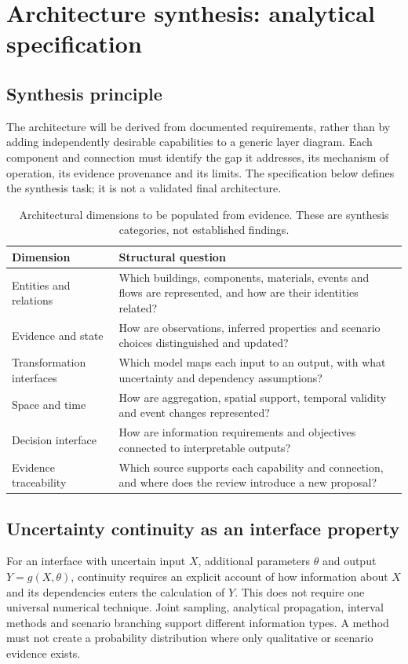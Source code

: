 \section{Architecture synthesis: analytical specification}
\subsection{Synthesis principle}
The architecture will be derived from documented requirements, rather than by adding independently desirable capabilities to a generic layer diagram. Each component and connection must identify the gap it addresses, its mechanism of operation, its evidence provenance and its limits. The specification below defines the synthesis task; it is not a validated final architecture.

\begin{table}[htbp]
\centering\small
\caption{Architectural dimensions to be populated from evidence. These are synthesis categories, not established findings.}
\begin{tabularx}{\textwidth}{@{}p{}X@{}}
\toprule
Dimension & Structural question \\
\midrule
Entities and relations & Which buildings, components, materials, events and flows are represented, and how are their identities related? \\
Evidence and state & How are observations, inferred properties and scenario choices distinguished and updated? \\
Transformation interfaces & Which model maps each input to an output, with what uncertainty and dependency assumptions? \\
Space and time & How are aggregation, spatial support, temporal validity and event changes represented? \\
Decision interface & How are information requirements and objectives connected to interpretable outputs? \\
Evidence traceability & Which source supports each capability and connection, and where does the review introduce a new proposal? \\
\bottomrule
\end{tabularx}
\end{table}

\subsection{Uncertainty continuity as an interface property}
For an interface with uncertain input $X$, additional parameters $\theta$ and output $Y=g(X,\theta)$, continuity requires an explicit account of how information about $X$ and its dependencies enters the calculation of $Y$. This does not require one universal numerical technique. Joint sampling, analytical propagation, interval methods and scenario branching support different information types. A method must not create a probability distribution where only qualitative or scenario evidence exists.

